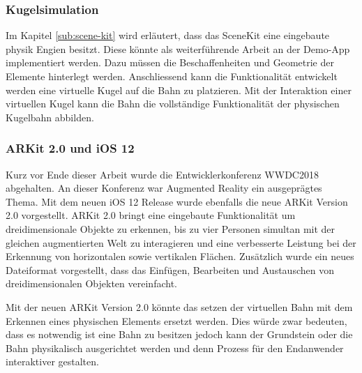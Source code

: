 \subsubsection{Kugelsimulation}
Im Kapitel \ref{sub:scene-kit} wird erläutert, dass das SceneKit eine eingebaute physik Engien besitzt. Diese könnte als weiterführende Arbeit an der Demo-App implementiert werden. Dazu müssen die Beschaffenheiten und Geometrie der Elemente hinterlegt werden. Anschliessend kann die Funktionalität entwickelt werden eine virtuelle Kugel auf die Bahn zu platzieren. Mit der Interaktion einer virtuellen Kugel kann die Bahn die vollständige Funktionalität der physischen Kugelbahn abbilden.

\subsubsection{ARKit 2.0 und iOS 12}
Kurz vor Ende dieser Arbeit wurde die Entwicklerkonferenz WWDC2018 abgehalten. An dieser Konferenz war Augmented Reality ein ausgeprägtes Thema. Mit dem neuen iOS 12 Release wurde ebenfalls die neue ARKit Version 2.0 vorgestellt. ARKit 2.0 bringt eine eingebaute Funktionalität um dreidimensionale Objekte zu erkennen, bis zu vier Personen simultan mit der gleichen augmentierten Welt zu interagieren und eine verbesserte Leistung bei der Erkennung von horizontalen sowie vertikalen Flächen. Zusätzlich wurde ein neues Dateiformat vorgestellt, dass das Einfügen, Bearbeiten und Austauschen von dreidimensionalen Objekten vereinfacht. 

Mit der neuen ARKit Version 2.0 könnte das setzen der virtuellen Bahn mit dem Erkennen eines physischen Elements ersetzt werden. Dies würde zwar bedeuten, dass es notwendig ist eine Bahn zu besitzen jedoch kann der Grundstein oder die Bahn physikalisch ausgerichtet werden und denn Prozess für den Endanwender interaktiver gestalten.
